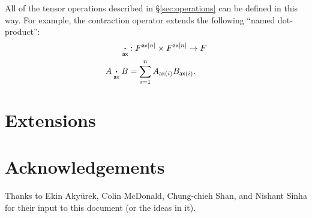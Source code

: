 \documentclass{article}
\begin{document}
All of the tensor operations described in \S\ref{sec:operations} can be defined in this way. For example, the contraction operator extends the following ``named dot-product'':
\begin{align*}
\mathbin{\mathop{\boldsymbol\cdot}\limits_{\mathsf{ax}}} &: F^{\mathsf{ax}[n]} \times F^{\mathsf{ax}[n]} \rightarrow F \\
A \mathbin{\mathop{\boldsymbol\cdot}\limits_{\mathsf{ax}}} B &= \sum_{i=1}^n A_{\mathsf{ax}(i)} B_{\mathsf{ax}(i)}.
\end{align*}

\section{Extensions}





\section*{Acknowledgements}

Thanks to Ekin Aky\"{u}rek, Colin McDonald, Chung-chieh Shan, and Nishant Sinha for their input to this document (or the ideas in it).

\iffalse %
\section*{References}
\fi



\end{document}
